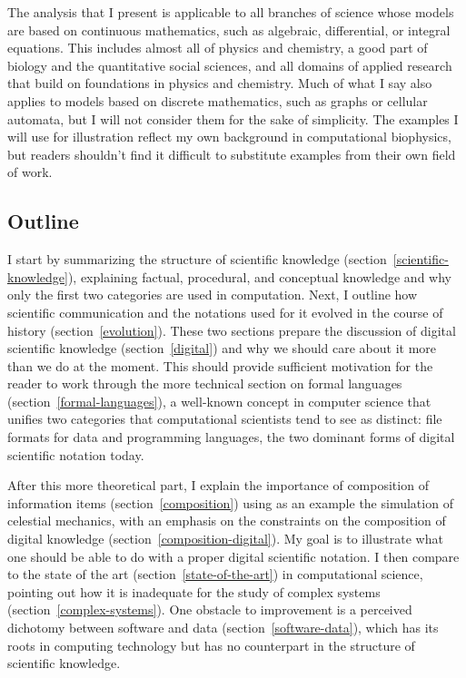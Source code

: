 The analysis that I present is applicable to all branches of science whose models are based on continuous mathematics, such as algebraic, differential, or integral equations. This includes almost all of physics and chemistry, a good part of biology and the quantitative social sciences, and all domains of applied research that build on foundations in physics and chemistry. Much of what I say also applies to models based on discrete mathematics, such as graphs or cellular automata, but I will not consider them for the sake of simplicity. The examples I will use for illustration reflect my own background in computational biophysics, but readers shouldn't find it difficult to substitute examples from their own field of work.

\subsection*{Outline}

I start by summarizing the structure of scientific knowledge (section~\ref{scientific-knowledge}), explaining factual, procedural, and conceptual knowledge and why only the first two categories are used in computation. Next, I outline how scientific communication and the notations used for it evolved in the course of history (section~\ref{evolution}). These two sections prepare the discussion of digital scientific knowledge (section~\ref{digital}) and why we should care about it more than we do at the moment. This should provide sufficient motivation for the reader to work through the more technical section on formal languages (section~\ref{formal-languages}), a well-known concept in computer science that unifies two categories that computational scientists tend to see as distinct: file formats for data and programming languages, the two dominant forms of digital scientific notation today.

After this more theoretical part, I explain the importance of composition of information items (section~\ref{composition}) using as an example the simulation of celestial mechanics, with an emphasis on the constraints on the composition of digital knowledge (section~\ref{composition-digital}). My goal is to illustrate what one should be able to do with a proper digital scientific notation. I then compare to the state of the art (section~\ref{state-of-the-art}) in computational science, pointing out how it is inadequate for the study of complex systems (section~\ref{complex-systems}). One obstacle to improvement is a perceived dichotomy between software and data (section~\ref{software-data}), which has its roots in computing technology but has no counterpart in the structure of scientific knowledge.

